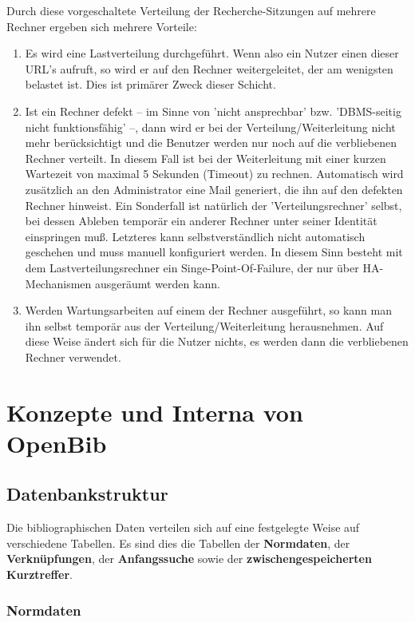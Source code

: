 \documentclass[11pt, twoside, a4paper, BCOR8mm, DIV12, bibtotoc,idxtotoc]{scrbook}
\begin{document}
Durch diese vorgeschaltete Verteilung der Recherche-Sitzungen auf
mehrere Rechner ergeben sich mehrere Vorteile:

\begin{enumerate}
\item Es wird eine Lastverteilung durchgeführt. Wenn also ein Nutzer
  einen dieser URL's aufruft, so wird er auf den Rechner
  weitergeleitet, der am wenigsten belastet ist.  Dies ist primärer
  Zweck dieser Schicht.
\item Ist ein Rechner defekt -- im Sinne von 'nicht ansprechbar'
  bzw. 'DBMS-seitig nicht funk\-tions\-fä\-hig' --, dann wird er bei der
  Verteilung/Weiterleitung nicht mehr berücksichtigt und die Benutzer
  werden nur noch auf die verbliebenen Rechner verteilt. In diesem
  Fall ist bei der Weiterleitung mit einer kurzen Wartezeit von
  maximal 5 Sekunden (Timeout) zu rechnen.  Automatisch wird
  zusätzlich an den Administrator eine Mail ge\-ne\-riert, die ihn
  auf den defekten Rechner hinweist. Ein Sonderfall ist natürlich der
  'Verteilungs\-rech\-ner' selbst, bei dessen Ableben temporär ein
  anderer Rechner unter seiner Identität einspringen muß. Letzteres
  kann selbstverständlich nicht automatisch geschehen und muss
  manuell konfiguriert werden. In diesem Sinn besteht mit dem
  Lastverteilungsrechner ein Singe-Point-Of-Failure, der nur über
  HA-Mechanismen ausgeräumt werden kann.
\item Werden Wartungsarbeiten auf einem der Rechner ausgeführt, so
  kann man ihn selbst temporär aus der Verteilung/Weiterleitung
  herausnehmen. Auf diese Weise ändert sich für die Nutzer nichts,
  es werden dann die verbliebenen Rechner verwendet.
\end{enumerate}


\chapter{Konzepte und Interna von OpenBib}


\section{Datenbankstruktur}

Die bibliographischen Daten verteilen sich auf eine festgelegte Weise
auf verschiedene Tabellen. Es sind dies die Tabellen der
\textbf{Normdaten}, der \textbf{Verknüpfungen}, der \textbf{Anfangssuche}
sowie der \textbf{zwischengespeicherten Kurztreffer}.


\subsection{Normdaten}
\end{document}
